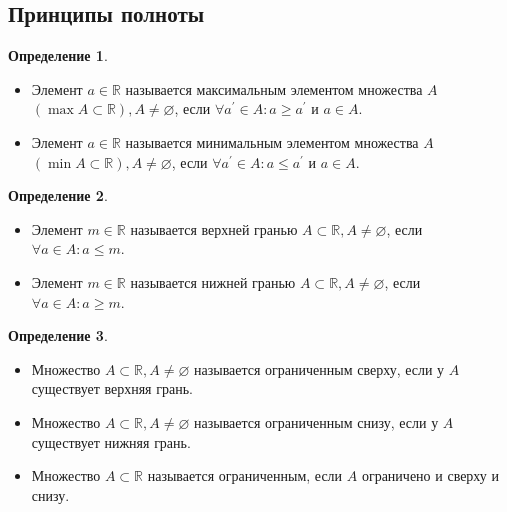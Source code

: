 \documentclass[a4paper, 12pt]{article}
\newcommand{\R}{\mathbb{R}}
\renewcommand{\emptyset}{\varnothing}
\newcommand\tab[1][.5cm]{\hspace*{#1}}
\theoremstyle{definition}
\newtheorem*{definition}{Определение}
\begin{document}
        \subsection{Принципы полноты}
        \begin{definition} \tab
            \begin{itemize}
                \item Элемент $a\in \R$ называется максимальным элементом множества $A$\\ $(\max A\subset \R), A\ne \emptyset$, если $\forall a^{\prime}\in A: a\geq a^{\prime}$ и $a\in A$.
                \item Элемент $a\in \R$ называется минимальным элементом множества $A$\\ $(\min A\subset \R), A\ne \emptyset$, если $\forall a^{\prime}\in A: a\leq a^{\prime}$ и $a\in A$.
            \end{itemize}
        \end{definition} \tab
        \begin{definition} \tab
            \begin{itemize}
                \item Элемент $m\in \R$ называется верхней гранью $A\subset \R, A\ne \emptyset$, если\\ $\forall a\in A: a\leq m$.
                \item Элемент $m\in \R$ называется нижней гранью $A\subset \R, A\ne \emptyset$, если\\ $\forall a\in A: a\geq m$.
            \end{itemize}
        \end{definition}
        \begin{definition} \tab
            \begin{itemize}
                \item Множество $A \subset \R, A\ne \emptyset$ называется ограниченным сверху, если у $A$ существует верхняя грань.
                \item Множество $A \subset \R, A\ne \emptyset$ называется ограниченным снизу, если у $A$ существует нижняя грань.
                \item Множество $A \subset \R$ называется ограниченным, если $A$ ограничено и сверху и снизу.
            \end{itemize}
        \end{definition}
\end{document}
